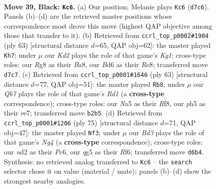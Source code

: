\documentclass[11pt]{article}
\begin{document}
\clearpage

\begin{figure}[p]\centering
\begin{subfigure}{0.46\textwidth}\centering
\resizebox{\linewidth}{!}{%
\newchessgame
\chessboard[
  setfen={r5r1/p2k2pp/3b4/n2p2QP/p2P2P1/4P2K/1q1N4/3R4 b - - 0 39},
  showmover=false,
  pgfstyle=straightmove, color=movearrow, markmove={d7-c6}
]}
\caption{}
\end{subfigure}\hfill
\begin{subfigure}{0.46\textwidth}\centering
\resizebox{\linewidth}{!}{%
\newchessgame
\chessboard[
  setfen={b3r1k1/p4p2/6p1/8/3NpP1q/4P2P/P5QK/1R6 b - - 0 32},
  showmover=false,
  pgfstyle=straightmove, color=movearrow, markmove={g8-h7}
]}
\caption{}
\end{subfigure}
\\[4pt]
\begin{subfigure}{0.46\textwidth}\centering
\resizebox{\linewidth}{!}{%
\newchessgame
\chessboard[
  setfen={3r1r1k/4R3/2pN1pq1/pp5p/3P1Q1P/P1K2P2/1P4P1/8 b - - 1 32},
  showmover=false,
  pgfstyle=straightmove, color=movearrow, markmove={d8-b8}
]}
\caption{}
\end{subfigure}\hfill
\begin{subfigure}{0.46\textwidth}\centering
\resizebox{\linewidth}{!}{%
\newchessgame
\chessboard[
  setfen={8/1p4k1/p1p2r2/P3r1n1/1Q2p1b1/2P5/1PBR1P2/5K2 b - - 7 38},
  showmover=false,
  pgfstyle=straightmove, color=movearrow, markmove={g5-f3}
]}
\caption{}
\end{subfigure}
\caption{\textbf{Move 39, Black: \texttt{Kc6}.} (a) Our position; Melanie plays \texttt{Kc6} (\texttt{d7c6}). Panels (b)--(d) are the retrieved master positions whose correspondence most drove this move (highest QAP objective among those that transfer to it). (b) Retrieved from \texttt{ccrl\_top\_p0002\#1904} (ply 63) [structural distance $d$=65, QAP obj=62]: the master played \texttt{Kh7}; under $\mu$ our \emph{Kd2} plays the role of that game's \emph{Kg1}; cross-type roles: our \emph{R}g8 as their \emph{B}a8, our \emph{B}d6 as their \emph{R}e8; transferred move \texttt{d7c7}. (c) Retrieved from \texttt{ccrl\_top\_p0001\#1646} (ply 63) [structural distance $d$=77, QAP obj=51]: the master played \texttt{Rb8}; under $\mu$ our \emph{Qb7} plays the role of that game's \emph{Rd1} (a \textbf{cross-type} correspondence); cross-type roles: our \emph{N}a5 as their \emph{R}f8, our \emph{p}h5 as their \emph{r}e7; transferred move \texttt{b2b5}. (d) Retrieved from \texttt{ccrl\_top\_p0001\#1206} (ply 75) [structural distance $d$=71, QAP obj=47]: the master played \texttt{Nf3}; under $\mu$ our \emph{Bd3} plays the role of that game's \emph{Ng4} (a \textbf{cross-type} correspondence); cross-type roles: our \emph{n}d2 as their \emph{P}c6, our \emph{q}g5 as their \emph{R}f6; transferred move \texttt{d6b4}. Synthesis: no retrieved analog transferred to \texttt{Kc6} -- the \texttt{search} selector chose it on value (material / mate); panels (b)--(d) show the strongest nearby analogies.}
\label{fig:thought-m77}
\end{figure}
\end{document}
